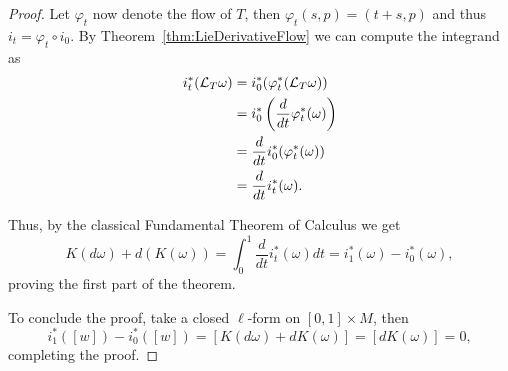 \begin{proof}
  Let $\varphi_t$ now denote the flow of $T$, then $\varphi_t(s, p) = (t+s, p)$ and thus $i_t = \varphi_t \circ i_0$.
  By Theorem~\ref{thm:LieDerivativeFlow} we can compute the integrand as
  \begin{align}
    i_t^*(\mathcal{L}_T\omega) & = i^*_0(\varphi_t^*(\mathcal{L}_T\omega))                    \\
                       & = i_0^*\left(\frac{d}{dt} \varphi_t^*(\omega)\right) \\
                       & = \frac{d}{dt} i_0^*(\varphi_t^*(\omega))            \\
                       & = \frac{d}{dt} i_t^*(\omega).
  \end{align}

  Thus, by the classical Fundamental Theorem of Calculus we get
  \begin{equation}
    K(d\omega) + d(K(\omega)) = \int_0^1 \frac{d}{dt} i_t^*(\omega) dt = i_1^*(\omega) - i_0^*(\omega),
  \end{equation}
  proving the first part of the theorem.

  To conclude the proof, take a closed $\ell$-form on $[0,1]\times M$, then
  \begin{equation}
    i_1^*([w]) - i_0^*([w]) = [K(d\omega) + dK(\omega)] = [dK(\omega)] =0,
  \end{equation}
  completing the proof.
\end{proof}

